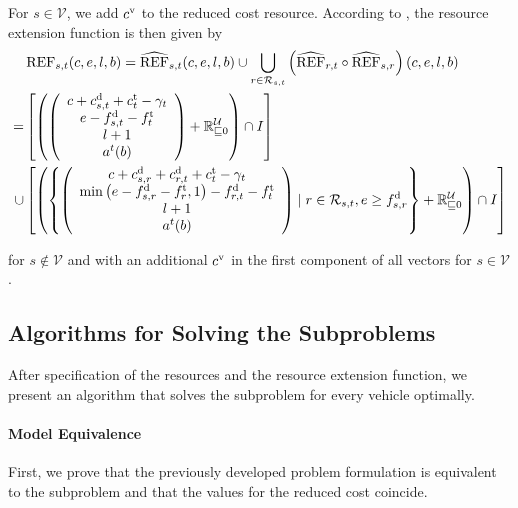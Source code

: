 For $s\in\mathcal{V}$, we add $c^{\operatorname{v}}$ to the reduced cost resource. According to , the resource extension function is then given by
\begin{align*}
	& \operatorname{REF}_{s,t}(c,e,l,b) = \widehat{\operatorname{REF}}_{s,t}(c,e,l,b)\cup\bigcup_{r\in\mathcal{R}_{s,t}}\left(\widehat{\operatorname{REF}}_{r,t}\circ\widehat{\operatorname{REF}}_{s,r}\right)(c,e,l,b) \\
	= & \left[\left(\left(\begin{array}{c}
		c + c^{\operatorname{d}}_{s,t} + c^{\operatorname{t}}_t - \gamma_t \\ e - f^{\operatorname{d}}_{s,t} - f^{\operatorname{t}}_t \\ l + 1 \\ a^t(b)
	\end{array} \right) + \mathbb{R}^{\mathcal{U}}_{\sqsubseteq 0}\right)\cap I\right] \\
	\cup & \left[\left(\left\{\left(\begin{array}{c}
		c + c^{\operatorname{d}}_{s,r} + c^{\operatorname{d}}_{r,t} + c^{\operatorname{t}}_t - \gamma_t \\ \min\left(e-f^{\operatorname{d}}_{s,r}-f^{\operatorname{t}}_r,1\right) - f^{\operatorname{d}}_{r,t} - f^{\operatorname{t}}_t \\ l + 1 \\ a^t(b)
	\end{array}\right) \mid r\in\mathcal{R}_{s,t}, e\geq f^{\operatorname{d}}_{s,r}\right\} + \mathbb{R}^{\mathcal{U}}_{\sqsubseteq 0}\right)\cap I\right]
\end{align*}

for $s\notin\mathcal{V}$ and with an additional $c^{\operatorname{v}}$ in the first component of all vectors for $s\in\mathcal{V}$.


\subsection{Algorithms for Solving the Subproblems}

After specification of the resources and the resource extension function, we present an algorithm that solves the subproblem for every vehicle optimally.

\paragraph{Model Equivalence} \parfill

First, we prove that the previously developed problem formulation is equivalent to the subproblem and that the values for the reduced cost coincide.

